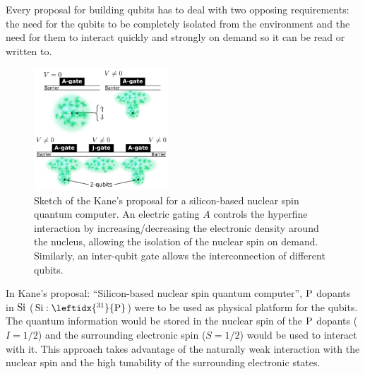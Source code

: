 
Every proposal for building qubits has to deal with two opposing requirements: the need for the qubits to be completely isolated from the environment and the need for them to interact quickly and strongly on demand so it can be read or written to.
\begin{figure}
\centering
\vspace{-10pt}
\includegraphics[width=0.45\textwidth]{introduction/figures/kane.pdf}
\vspace{-7pt}
\caption{Sketch of the Kane's proposal for a silicon-based nuclear spin quantum computer. An electric gating $A$ controls the hyperfine interaction by increasing/decreasing the electronic density around the nucleus, allowing the isolation of the nuclear spin on demand. Similarly, an inter-qubit gate allows the interconnection of different qubits.}
\label{kane_proposal}
\end{figure}

In Kane's proposal: ``Silicon-based nuclear spin quantum computer'', $\ce{P}$ dopants in $\ce{Si}$ ($\ce{Si}:\leftidx{^{31}}{\ce{P}}$) were to be used as physical platform for the qubits. The quantum information would be stored in the nuclear spin of the $\ce{P}$ dopants ($I=1/2$) and the surrounding electronic spin ($S=1/2$) would be used to interact with it. This approach takes advantage of the naturally weak interaction with the nuclear spin and the high tunability of the surrounding electronic states.

